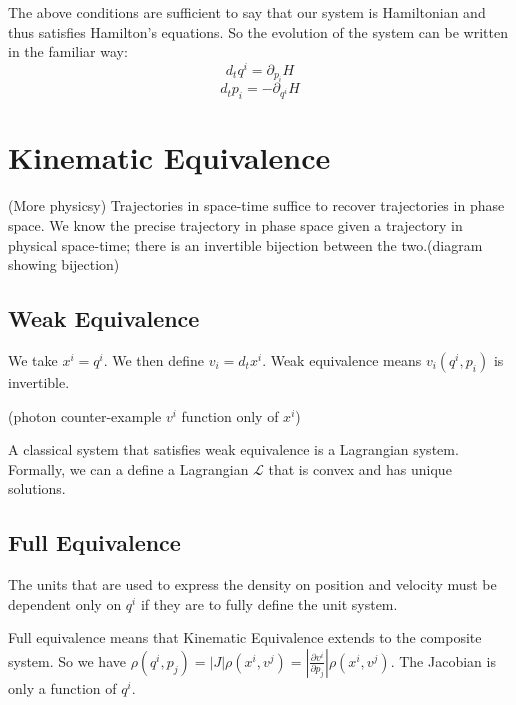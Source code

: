 \documentclass{article}
\begin{document}
\begin{prop}
	The above conditions are sufficient to say that our system is Hamiltonian and thus satisfies Hamilton's equations. So the evolution of the system can be written in the familiar way:
	$$d_tq^i = \partial_{p_i}H$$
	$$d_tp_i = -\partial_{q^i}H$$
\end{prop} 
	

\section{Kinematic Equivalence}

\begin{assump}
	(More physicsy) Trajectories in space-time suffice to recover trajectories in phase space. We know the precise trajectory in phase space given a trajectory in physical space-time; there is an invertible bijection between the two.(diagram showing bijection)
\end{assump}

\subsection{Weak Equivalence}

\begin{defn}
	We take $x^i = q^i$. We then define $v_i = d_tx^i$. Weak equivalence means $v_i(q^i, p_i)$ is invertible.
\end{defn}

(photon counter-example $v^i$ function only of $x^i$)

\begin{prop}
	A classical system that satisfies weak equivalence is a Lagrangian system. Formally, we can a define a Lagrangian $\mathcal{L}$ that is convex and has unique solutions.
\end{prop}

\subsection{Full Equivalence}

The units that are used to express the density on position and velocity must be dependent only on $q^i$ if they are to fully define the unit system.

\begin{defn}
	Full equivalence means that Kinematic Equivalence extends to the composite system. So we have $\rho(q^i,p_j) = \left|J\right|\rho(x^i,v^j) = \left|\frac{\partial v^i}{\partial p_j}\right|\rho(x^i,v^j)$. The Jacobian is only a function of $q^i$.
\end{defn}
\end{document}
